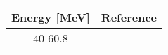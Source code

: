 \begin{tabular}{c c} 
    \toprule 
    \bf{Energy [MeV]} & \bf{Reference} \\
    \midrule
    40-60.8 & \cite{Menet71}\\
    \bottomrule
\end{tabular}
